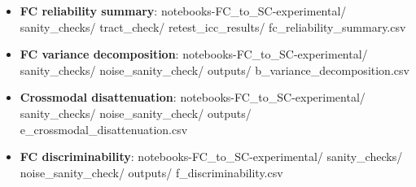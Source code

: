 \begin{itemize}
  \textbf{Reliability-residualized PC3 enrichment}: notebooks-FC\_to\_SC-experimental/ sanity\_checks/ tract\_check/ enrichment\_residual\_top200.csv
\item
  \textbf{FC reliability summary}: notebooks-FC\_to\_SC-experimental/ sanity\_checks/ tract\_check/ retest\_icc\_results/ fc\_reliability\_summary.csv
\item
  \textbf{FC variance decomposition}: notebooks-FC\_to\_SC-experimental/ sanity\_checks/ noise\_sanity\_check/ outputs/ b\_variance\_decomposition.csv
\item
  \textbf{Crossmodal disattenuation}: notebooks-FC\_to\_SC-experimental/ sanity\_checks/ noise\_sanity\_check/ outputs/ e\_crossmodal\_disattenuation.csv
\item
  \textbf{FC discriminability}: notebooks-FC\_to\_SC-experimental/ sanity\_checks/ noise\_sanity\_check/ outputs/ f\_discriminability.csv
\end{itemize}

